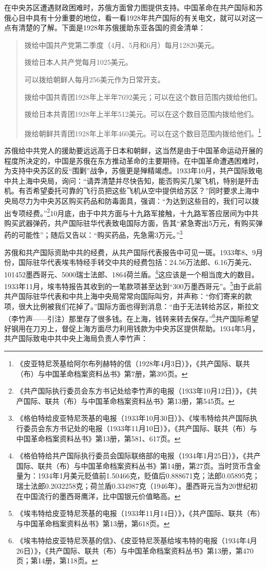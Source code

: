 在中央苏区遭遇财政困难时，苏俄方面曾力图提供支持。中国革命在共产国际和苏俄心目中具有十分重要的地位，看一看1928年共产国际的有关电文，就可以对这一点有清楚的了解。下面是1928年苏俄援助东亚各国的资金清单：

\begin{quote}

拨给中国共产党第二季度（4月、5月和6月）每月12820美元。

拨给日本人共产党每月1025美元。

可以拨给朝鲜人每月256美元作为日常开支。

拨给中国共青团1928年上半年7692美元；可以在这个数目范围内拨给他们。

拨给日本共青团1928年上半年512美元。可以在这个数目范围内拨给他们。

拨给朝鲜共青团1928年上半年460美元。可以在这个数目范围内拨给他们。\footnote{《皮亚特尼茨基给阿尔布列赫特的信（1928年4月3日）》，《共产国际、联共（布）与中国革命档案资料丛书》第7册，第395页。}
\end{quote}


苏俄给中共党人的援助要远远高于日本和朝鲜，这当然是由于中国革命运动开展的程度所决定的，中国是苏俄在东方推动革命的主要期待。在中国革命遭遇困难时，为支持中央苏区的反“围剿”战争，苏俄更是殚精竭虑。1933年10月，共产国际致电中共上海中央局，询问：“请弄清楚并尽快告知，能否购买几架飞机，特别是歼击机。有否希望委托可靠的飞行员把这些飞机从空中提供给苏区？”同时要求上海中央局尽力为中央苏区购买药品和防毒面具，强调：“为达到这些目的，我们可以拨出专项经费。”\footnote{《共产国际执行委员会东方书记处给李竹声的电报（1933年10月12日）》，《共产国际、联共（布）与中国革命档案资料丛书》第13册，第545页。}10月底，由于中共方面与十九路军接触，十九路军答应居间为中共购买武器弹药，共产国际驻华代表致电国际方面，告其“紧急寄出5万元，有购买弹药的可能性”；随后又告以：“购买药品，先急需3万元。”\footnote{《格伯特给皮亚特尼茨基的电报（1933年10月30日）》、《埃韦特给共产国际执行委员会东方书记处的电报（1933年11月10日）》，《共产国际、联共（布）与中国革命档案资料丛书》第13册，第581、617页。}


苏俄和共产国际资助中共的经费，从共产国际代表报告中可见一斑。1933年8、9月份，国际驻华代表埃韦特经手转交中共的经费包括：24.56万法郎、6.16万美元、101452墨西哥元、5000瑞士法郎、1864荷兰盾。\footnote{《格伯特给共产国际执行委员会国际联络部的电报（1934年1月25日）》，《共产国际、联共（布）与中国革命档案资料丛书》第14册，第27页。当时货币含金量为：1934年1月美元贬值前1.50466克，贬值后0.888671克；法郎0.05895克；瑞士法郎0.2032258克；荷兰盾0.334987克（1946年）。墨西哥元当为20世纪初在中国流行的墨西哥鹰洋，比中国银元价值略高。}这应该是一个相当庞大的数目。1933年11月，埃韦特报告其收到的一笔款项甚至达到“300万墨西哥元”。\footnote{《埃韦特给皮亚特尼茨基的电报（1933年11月14日）》，《共产国际、联共（布）与中国革命档案资料丛书》第13册，第618页。}由于此前共产国际驻华代表和中共上海中央局常常向国际叫穷，并声称：“你们寄来的款项，很大比例被我们花掉了。”国际方面也得到消息：“由于无法转给苏区，斯拉文（李竹声——引注）那里存了很多钱。在上海，钱转来转去保存。”\footnote{《埃韦特给皮亚特尼茨基的信》、《皮亚特尼茨基给埃韦特的电报（1934年4月26日）》，《共产国际、联共（布）与中国革命档案资料丛书》第13册，第470页；第14册，第118页。}共产国际希望好钢用在刀刃上，督促上海方面尽力利用钱款为中央苏区提供帮助。1934年5月，共产国际致电中共中央上海局负责人李竹声：

